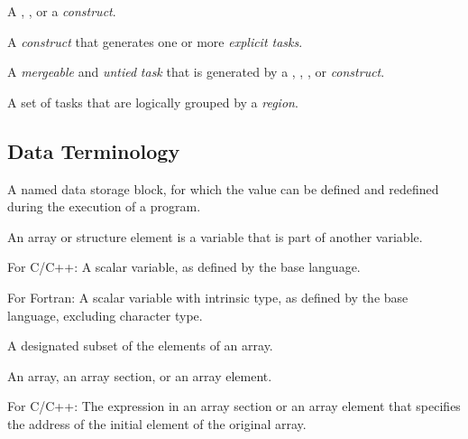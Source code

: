 \glossarydefstart
A , , or a  \emph{construct}.
\glossarydefend
\bigskip

\glossarydefstart
A \emph{construct} that generates one or more \emph{explicit tasks}.
\glossarydefend
\bigskip

\glossarydefstart
A \emph{mergeable} and \emph{untied} \emph{task} that is generated by a , , , or  \emph{construct}.
\glossarydefend

\glossarydefstart
A set of tasks that are logically grouped by a  \emph{region}.
\glossarydefend

\subsection{Data Terminology}
\label{subsec:Data Terminology} 
\glossarydefstart
A named data storage block, for which the value can be defined and redefined during the 
execution of a program.

\begin{adjustwidth}{-0.75in}{0in}
\begin{note}
An array or structure element is a variable that is part of another variable.
\end{note}
\end{adjustwidth}
\glossarydefend

\glossarydefstart
For C/C++:
\nopagebreak
A scalar variable, as defined by the base language.

For Fortran:
\nopagebreak
A scalar variable with intrinsic type, as defined by the base language,
excluding character type.
\glossarydefend


\glossarydefstart
A designated subset of the elements of an array.
\glossarydefend

\glossarydefstart
An array, an array section, or an array element.
\glossarydefend

\glossarydefstart
For C/C++: The expression in an array section or an array element that specifies
the address of the initial element of the original array.
\glossarydefend

